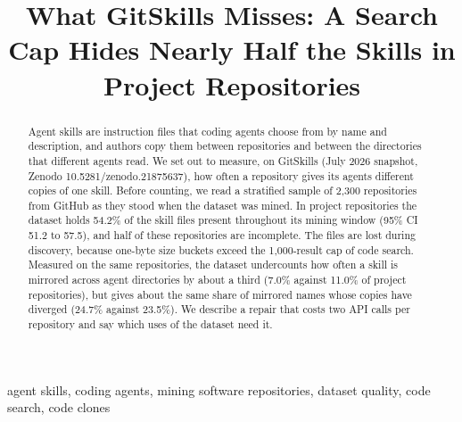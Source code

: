 \documentclass[10pt,conference]{IEEEtran}
\begin{document}
\title{What GitSkills Misses: A Search Cap Hides Nearly Half the Skills in Project Repositories}
\author{}
\maketitle

\begin{abstract}
Agent skills are instruction files that coding agents choose from by name and description, and authors copy them
between repositories and between the directories that different agents read. We set out to measure, on GitSkills
(July 2026 snapshot, Zenodo 10.5281/zenodo.21875637), how often a repository gives its agents different copies of one
skill. Before counting, we read a stratified sample of 2,300 repositories from GitHub as they stood when the dataset
was mined. In project repositories the dataset holds 54.2\% of the skill files present throughout its mining window
(95\% CI 51.2 to 57.5), and half of these repositories are incomplete. The files are lost during discovery, because
one-byte size buckets exceed the 1,000-result cap of code search. Measured on the same repositories, the dataset
undercounts how often a skill is mirrored across agent directories by about a third (7.0\% against 11.0\% of project
repositories), but gives about the same share of mirrored names whose copies have diverged (24.7\% against 23.5\%).
We describe a repair that costs two API calls per repository and say which uses of the dataset need it.
\end{abstract}

\begin{IEEEkeywords}
agent skills, coding agents, mining software repositories, dataset quality, code search, code clones
\end{IEEEkeywords}






% 


% 
\end{document}
